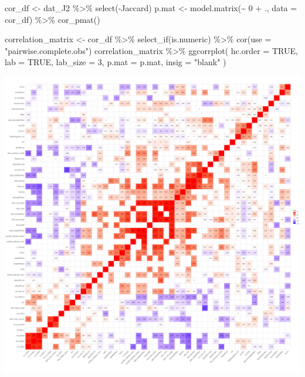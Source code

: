 \documentclass[
  letterpaper,
  DIV=11,
  numbers=noendperiod]{scrreprt}
\newenvironment{Shaded}{\begin{snugshade}}{\end{snugshade}}
\newcommand{\AttributeTok}[1]{\textcolor[rgb]{0.40,0.45,0.13}{#1}}
\newcommand{\ConstantTok}[1]{\textcolor[rgb]{0.56,0.35,0.01}{#1}}
\newcommand{\DecValTok}[1]{\textcolor[rgb]{0.68,0.00,0.00}{#1}}
\newcommand{\FunctionTok}[1]{\textcolor[rgb]{0.28,0.35,0.67}{#1}}
\newcommand{\NormalTok}[1]{\textcolor[rgb]{0.00,0.23,0.31}{#1}}
\newcommand{\OtherTok}[1]{\textcolor[rgb]{0.00,0.23,0.31}{#1}}
\newcommand{\SpecialCharTok}[1]{\textcolor[rgb]{0.37,0.37,0.37}{#1}}
\newcommand{\StringTok}[1]{\textcolor[rgb]{0.13,0.47,0.30}{#1}}
\begin{document}
\begin{Shaded}
\begin{Highlighting}[]
\NormalTok{cor\_df }\OtherTok{\textless{}{-}}\NormalTok{ dat\_J2 }\SpecialCharTok{\%\textgreater{}\%} \FunctionTok{select}\NormalTok{(}\SpecialCharTok{{-}}\NormalTok{Jaccard)}
\NormalTok{p.mat }\OtherTok{\textless{}{-}} \FunctionTok{model.matrix}\NormalTok{(}\SpecialCharTok{\textasciitilde{}} \DecValTok{0} \SpecialCharTok{+}\NormalTok{ ., }\AttributeTok{data =}\NormalTok{ cor\_df) }\SpecialCharTok{\%\textgreater{}\%}
    \FunctionTok{cor\_pmat}\NormalTok{()}

\NormalTok{correlation\_matrix }\OtherTok{\textless{}{-}}\NormalTok{ cor\_df }\SpecialCharTok{\%\textgreater{}\%}
    \FunctionTok{select\_if}\NormalTok{(is.numeric) }\SpecialCharTok{\%\textgreater{}\%}
    \FunctionTok{cor}\NormalTok{(}\AttributeTok{use =} \StringTok{"pairwise.complete.obs"}\NormalTok{)}
\NormalTok{correlation\_matrix }\SpecialCharTok{\%\textgreater{}\%}
    \FunctionTok{ggcorrplot}\NormalTok{(}
        \AttributeTok{hc.order =} \ConstantTok{TRUE}\NormalTok{,}
        \AttributeTok{lab =} \ConstantTok{TRUE}\NormalTok{,}
        \AttributeTok{lab\_size =} \DecValTok{3}\NormalTok{,}
        \AttributeTok{p.mat =}\NormalTok{ p.mat,}
        \AttributeTok{insig =} \StringTok{"blank"}
\NormalTok{    )}
\end{Highlighting}
\end{Shaded}

\includegraphics{01_DataPrep_files/figure-pdf/correlation-matrix-J2-1.pdf}
\end{document}
